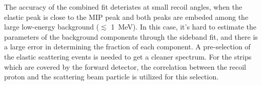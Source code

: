 \documentclass[number,5p]{elsarticle}
\begin{document}
The accuracy of the combined fit deteriates at small recoil angles, when the elastic peak is close to the MIP peak and both peaks are embeded among the large
low-energy background ($\lesssim$ \SI{1}{\MeV}).
In this case, it's hard to estimate the parameters of the background components
through the sideband fit, and there is a large error in determining the fraction of
each component.
A pre-selection of the elastic scattering events is needed to get a cleaner spectrum.
For the strips which are covered by the forward detector, the correlation
between the recoil proton and the scattering beam particle is utilized for this selection.

\end{document}
